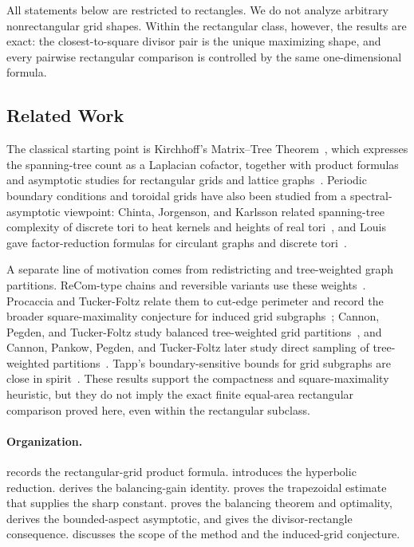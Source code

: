 \documentclass[11pt]{article}
\numberwithin{equation}{section}
\begin{document}
All statements below are restricted to rectangles. We do not analyze arbitrary nonrectangular grid shapes. Within the rectangular class, however, the results are exact: the closest-to-square divisor pair is the unique maximizing shape, and every pairwise rectangular comparison is controlled by the same one-dimensional formula.

\subsection{Related Work}

The classical starting point is Kirchhoff's Matrix--Tree Theorem~\cite{Kirchhoff1847}, which expresses the spanning-tree count as a Laplacian cofactor, together with product formulas and asymptotic studies for rectangular grids and lattice graphs~\cite{Temperley1974,Wu1977,ShrockWu2000,GolinLeungWangYong2005}. Periodic boundary conditions and toroidal grids have also been studied from a spectral-asymptotic viewpoint: Chinta, Jorgenson, and Karlsson related spanning-tree complexity of discrete tori to heat kernels and heights of real tori~\cite{ChintaJorgensonKarlsson2010,ChintaJorgensonKarlsson2012}, and Louis gave factor-reduction formulas for circulant graphs and discrete tori~\cite{Louis2015}.

A separate line of motivation comes from redistricting and tree-weighted graph partitions. ReCom-type chains and reversible variants use these weights~\cite{DeFordDuchinSolomon2021,CannonDuchinRandallRule2026}. Procaccia and Tucker-Foltz relate them to cut-edge perimeter and record the broader square-maximality conjecture for induced grid subgraphs~\cite{ProcacciaTuckerFoltz2022}; Cannon, Pegden, and Tucker-Foltz study balanced tree-weighted grid partitions~\cite{CannonPegdenTuckerFoltz2024}, and Cannon, Pankow, Pegden, and Tucker-Foltz later study direct sampling of tree-weighted partitions~\cite{CannonPankowPegdenTuckerFoltz2025}. Tapp's boundary-sensitive bounds for grid subgraphs are close in spirit~\cite{Tapp2024}. These results support the compactness and square-maximality heuristic, but they do not imply the exact finite equal-area rectangular comparison proved here, even within the rectangular subclass.

\paragraph{Organization.}
 records the rectangular-grid product formula.  introduces the hyperbolic reduction.  derives the balancing-gain identity.  proves the trapezoidal estimate that supplies the sharp constant.  proves the balancing theorem and optimality, derives the bounded-aspect asymptotic, and gives the divisor-rectangle consequence.  discusses the scope of the method and the induced-grid conjecture.
\end{document}
